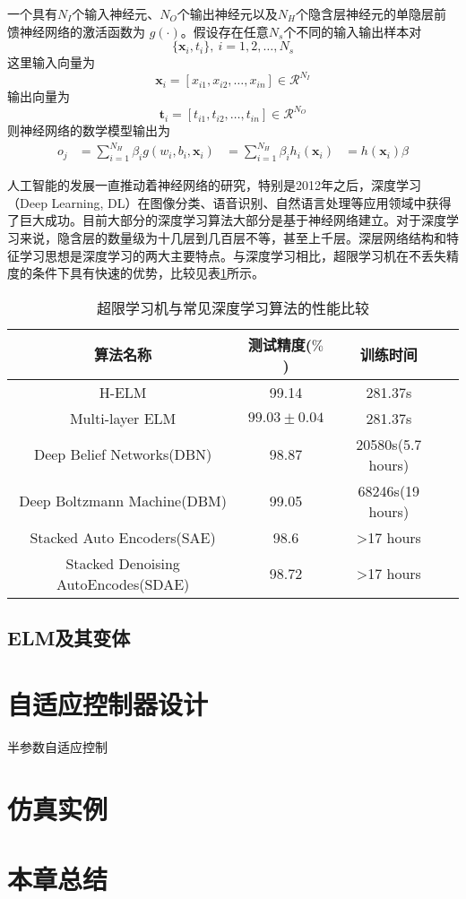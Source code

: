 一个具有$N_{I}$个输入神经元、$N_{O}$个输出神经元以及$N_{H}$个隐含层神经元的单隐层前馈神经网络的激活函数为
$g(\cdot)$。假设存在任意$N_{s}$个不同的输入输出样本对
$$\{\bm{x}_{i},t_{i}\},\ i=1,2,\ldots,N_{s}$$
这里输入向量为
$$\bm{x}_{i}=[x_{i1},x_{i2},\ldots,x_{in}]\in \mathcal{R}^{N_{I}}$$
输出向量为
$$\bm{t}_{i}=[t_{i1},t_{i2},\ldots,t_{in}]\in \mathcal{R}^{N_{O}}$$
则神经网络的数学模型输出为
\begin{equation}%
\label{eq:4.slfn}
\begin{split}%
o_{j}&=\sum_{i=1}^{N_{H}}\beta_{i}g(w_{i},b_{i},\bm{x}_{i})
&=\sum_{i=1}^{N_{H}}\beta_{i}h_{i}(\bm{x}_{i})
&=h(\bm{x}_{i})\beta
\end{split}
\end{equation}

人工智能的发展一直推动着神经网络的研究，特别是2012年之后，深度学习（Deep Learning, DL）在图像分类、语音识别、自然语言处理等应用领域中获得了巨大成功。目前大部分的深度学习算法大部分是基于神经网络建立。对于深度学习来说，隐含层的数量级为十几层到几百层不等，甚至上千层。深层网络结构和特征学习思想是深度学习的两大主要特点。与深度学习相比，超限学习机在不丢失精度的条件下具有快速的优势，比较见表\ref{tab:elm-dl}所示。

\begin{table}
\centering
\caption{超限学习机与常见深度学习算法的性能比较}\label{tab:elm-dl}
\begin{tabular*}{0.9\textwidth}{@{\extracolsep{\fill}}cccc}
\toprule
算法名称	&测试精度($\%$)	&训练时间 \\
\midrule
H-ELM	&99.14	&281.37s\\
Multi-layer ELM	&$99.03\pm0.04$	&281.37s\\
Deep Belief Networks(DBN)	&98.87	&20580s(5.7 hours)\\
Deep Boltzmann Machine(DBM)	&99.05	&68246s(19 hours)\\
Stacked Auto Encoders(SAE)	&98.6	&>17 hours\\
Stacked Denoising AutoEncodes(SDAE)	&98.72	&>17 hours\\
\bottomrule
\end{tabular*}
\end{table}

\subsection{ELM及其变体}

\section{自适应控制器设计}
半参数自适应控制

\section{仿真实例}

\section{本章总结}
